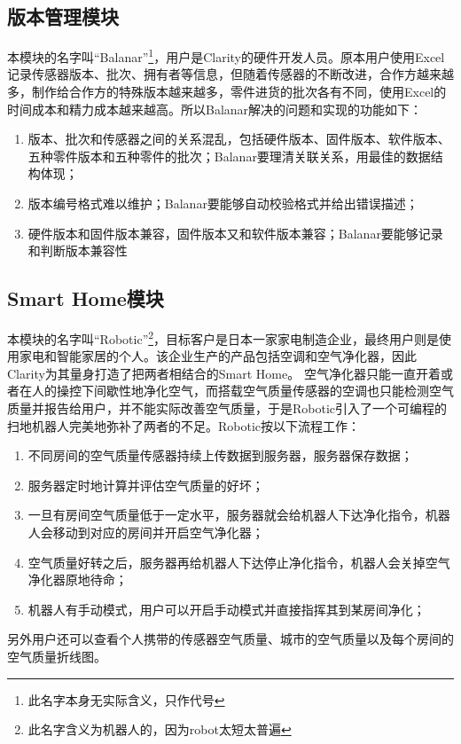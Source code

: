 \subsection{版本管理模块}
本模块的名字叫“Balanar”\footnote{此名字本身无实际含义，只作代号}，用户是Clarity的硬件开发人员。原本用户使用Excel记录传感器版本、批次、拥有者等信息，但随着传感器的不断改进，合作方越来越多，制作给合作方的特殊版本越来越多，零件进货的批次各有不同，使用Excel的时间成本和精力成本越来越高。所以Balanar解决的问题和实现的功能如下：
\begin{enumerate}
  \item 版本、批次和传感器之间的关系混乱，包括硬件版本、固件版本、软件版本、五种零件版本和五种零件的批次；Balanar要理清关联关系，用最佳的数据结构体现；
  \item 版本编号格式难以维护；Balanar要能够自动校验格式并给出错误描述；
  \item 硬件版本和固件版本兼容，固件版本又和软件版本兼容；Balanar要能够记录和判断版本兼容性
\end{enumerate}

\subsection{Smart Home模块}
本模块的名字叫“Robotic”\footnote{此名字含义为机器人的，因为robot太短太普遍}，目标客户是日本一家家电制造企业，最终用户则是使用家电和智能家居的个人。该企业生产的产品包括空调和空气净化器，因此Clarity为其量身打造了把两者相结合的Smart Home。
空气净化器只能一直开着或者在人的操控下间歇性地净化空气，而搭载空气质量传感器的空调也只能检测空气质量并报告给用户，并不能实际改善空气质量，于是Robotic引入了一个可编程的扫地机器人完美地弥补了两者的不足。Robotic按以下流程工作：
\begin{enumerate}
  \item 不同房间的空气质量传感器持续上传数据到服务器，服务器保存数据；
  \item 服务器定时地计算并评估空气质量的好坏；
  \item 一旦有房间空气质量低于一定水平，服务器就会给机器人下达净化指令，机器人会移动到对应的房间并开启空气净化器；
  \item 空气质量好转之后，服务器再给机器人下达停止净化指令，机器人会关掉空气净化器原地待命；
  \item 机器人有手动模式，用户可以开启手动模式并直接指挥其到某房间净化；
\end{enumerate}

另外用户还可以查看个人携带的传感器空气质量、城市的空气质量以及每个房间的空气质量折线图。

